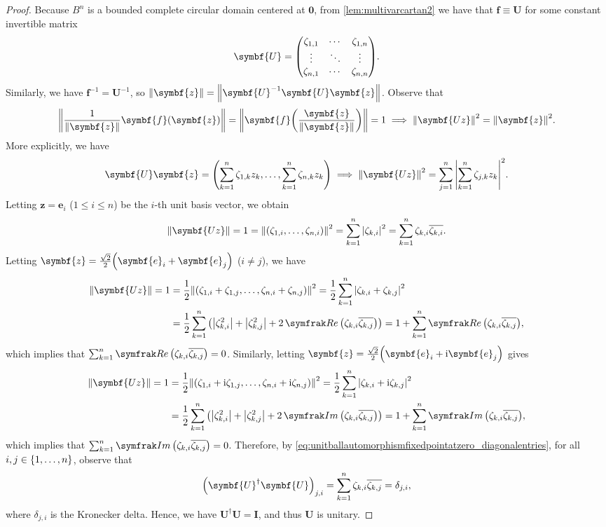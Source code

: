 \begin{proof}
    Because \(B^n\) is a bounded complete circular domain centered at \(\symbf{0}\), from \cref{lem:multivarcartan2} we have that \(\symbf{f}\equiv\symbf{U}\) for some constant invertible matrix \[\symbf{U}=\mqty(\zeta_{1,1}&\cdots&\zeta_{1,n}\\\vdots&\ddots&\vdots\\\zeta_{n,1}&\cdots&\zeta_{n,n}).\]
    Similarly, we have \(\symbf{f}^{-1}=\symbf{U}^{-1}\), so \(\norm{\symbf{z}}=\norm{\symbf{U}^{-1}\symbf{U}\symbf{z}}\). Observe that \[\norm{\frac1{\norm{\symbf{z}}}\symbf{f}\qty(\symbf{z})}=\norm{\symbf{f}\qty(\frac{\symbf{z}}{\norm{\symbf{z}}})}=1\implies\norm{\symbf{Uz}}^2=\norm{\symbf{z}}^2.\]
    More explicitly, we have \[\symbf{U}\symbf{z}=\qty(\sum_{k=1}^n\zeta_{1,k}z_k,\ldots,\sum_{k=1}^n\zeta_{n,k}z_k)\implies\norm{\symbf{Uz}}^2=\sum_{j=1}^n\abs{\sum_{k=1}^n\zeta_{j,k}z_k}^2.\]
    Letting \(\symbf{z}=\symbf{e}_i\) (\(1\leq i\leq n\)) be the \(i\)-th unit basis vector, we obtain
    \begin{equation}
        \norm{\symbf{Uz}}=1=\norm{\qty(\zeta_{1,i},\ldots,\zeta_{n,i})}^2=\sum_{k=1}^n\abs{\zeta_{k,i}}^2=\sum_{k=1}^n\zeta_{k,i}\overline{\zeta_{k,i}}.\label{eq:unitballautomorphismfixedpointatzero_diagonalentries}
    \end{equation}
    Letting \(\symbf{z}=\frac{\sqrt{2}}{2}\qty(\symbf{e}_i+\symbf{e}_j)\) (\(i\neq j\)), we have
    \begin{align*}
        \norm{\symbf{Uz}}=1 & =\frac12\norm{\qty(\zeta_{1,i}+\zeta_{1,j},\dots,\zeta_{n,i}+\zeta_{n,j})}^2=\frac12\sum_{k=1}^n\abs{\zeta_{k,i}+\zeta_{k,j}}^2                                         \\
                         & =\frac12\sum_{k=1}^n\qty(\abs{\zeta_{k,i}^2}+\abs{\zeta_{k,j}^2}+2\Re\qty(\zeta_{k,i}\overline{\zeta_{k,j}}))=1+\sum_{k=1}^n\Re\qty(\zeta_{k,i}\overline{\zeta_{k,j}}),
    \end{align*}
    which implies that \(\sum_{k=1}^n\Re\qty(\zeta_{k,i}\overline{\zeta_{k,j}})=0\). Similarly, letting \(\symbf{z}=\frac{\sqrt{2}}{2}\qty(\symbf{e}_i+\ii\symbf{e}_j)\) gives
    \begin{align*}
        \norm{\symbf{Uz}}=1 & =\frac12\norm{\qty(\zeta_{1,i}+\ii\zeta_{1,j},\dots,\zeta_{n,i}+\ii\zeta_{n,j})}^2=\frac12\sum_{k=1}^n\abs{\zeta_{k,i}+\ii\zeta_{k,j}}^2                                \\
                         & =\frac12\sum_{k=1}^n\qty(\abs{\zeta_{k,i}^2}+\abs{\zeta_{k,j}^2}+2\Im\qty(\zeta_{k,i}\overline{\zeta_{k,j}}))=1+\sum_{k=1}^n\Im\qty(\zeta_{k,i}\overline{\zeta_{k,j}}),
    \end{align*}
    which implies that \(\sum_{k=1}^n\Im\qty(\zeta_{k,i}\overline{\zeta_{k,j}})=0\). Therefore, by \cref{eq:unitballautomorphismfixedpointatzero_diagonalentries}, for all \(i,j\in\cbraces{1,\ldots,n}\), observe that
    \[\qty(\symbf{U}^\dagger\symbf{U})_{j,i}=\sum_{k=1}^n\zeta_{k,i}\overline{\zeta_{k,j}}=\delta_{j,i},\] where \(\delta_{j,i}\) is the Kronecker delta. Hence, we have \(\symbf{U}^\dagger\symbf{U}=\symbf{I}\), and thus \(\symbf{U}\) is unitary.


\end{proof}
